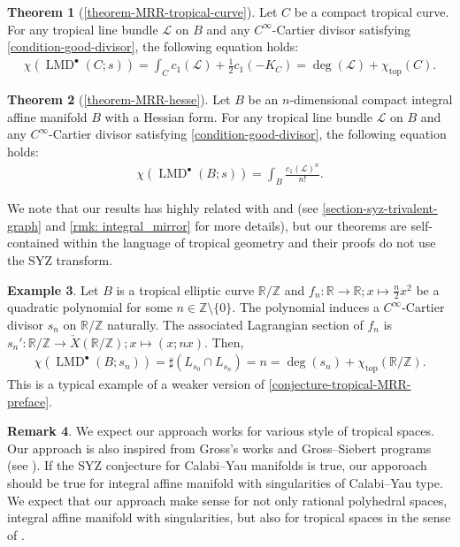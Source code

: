 \documentclass[a4paper,dvipdfmx,reqno,12pt]{amsart}
\theoremstyle{definition}
\newtheorem{theorem}{Theorem}[section]
\newtheorem{example}[theorem]{Example}
\newtheorem{remark}[theorem]{Remark}
\newcommand{\opn}[1]{\operatorname{#1}}
\numberwithin{equation}{section}
\begin{document}
\begin{theorem}[{\cref{theorem-MRR-tropical-curve}}] 
\label{theorem-MRR-curve-preface}
Let $C$ be a compact tropical curve.
For any tropical line bundle 
$\mathcal{L}$ on $B$ and any $C^{\infty}$-Cartier
divisor satisfying \cref{condition-good-divisor},
the following equation holds:
\begin{align}
\chi(\opn{LMD}^{\bullet}(C;s))=
\int_C c_1(\mathcal{L})+\frac{1}{2}c_1(-K_C)
=\opn{deg}(\mathcal{L})+\chi_{\opn{top}}(C). 
\end{align}
\end{theorem}

\begin{theorem}[{\cref{theorem-MRR-hesse}}]
\label{theorem-MRR-hesse-preface}
Let $B$ be an $n$-dimensional compact integral affine manifold $B$ with 
a Hessian form. For any tropical line bundle 
$\mathcal{L}$ on $B$ and any $C^{\infty}$-Cartier
divisor satisfying \cref{condition-good-divisor},
the following equation holds:
\begin{align}
\chi(\opn{LMD}^{\bullet}(B;s))=
\int_B \frac{c_1(\mathcal{L})^{n}}{n!}.
\end{align}

\end{theorem}


We note that our results has highly related with 
 \cite{MR4301560} and \cite{auroux2022lagrangian} (see \cref{section-syz-trivalent-graph} and \cref{rmk: integral_mirror} 
for more details), but our theorems 
are self-contained within the language of tropical 
geometry and their proofs do not use the SYZ
transform.


\begin{example}
Let $B$ is a tropical elliptic curve 
$\mathbb{R}/\mathbb{Z}$ and
$f_n\colon \mathbb{R}\to \mathbb{R};
x\mapsto \frac{n}{2}x^{2}$ be a quadratic polynomial
for some $n\in \mathbb{Z}\setminus\{0\}$.
The polynomial induces a $C^{\infty}$-Cartier divisor 
$s_n$ on $\mathbb{R}/\mathbb{Z}$ naturally.
The associated Lagrangian section of $f_n$ is
$s_n'\colon\mathbb{R}/\mathbb{Z}\to 
\check{X}(\mathbb{R}/\mathbb{Z});x\mapsto (x;nx)$.
Then,
\begin{align}
\chi(\opn{LMD}^{\bullet}(B;s_n))=
\sharp(L_{s_0}\cap L_{s_n})=n
=\opn{deg}(s_n)+\chi_{\opn{top}}(\mathbb{R}/\mathbb{Z}). 
\end{align}
This is a typical example of a weaker version of 
\cref{conjecture-tropical-MRR-preface}.
\end{example}

\begin{remark}
We expect our approach works for various style 
of tropical spaces. 
Our approach is 
also inspired from Gross's 
works 
\cite{grossSpecialLagrangianFibrations1998a} 
and Gross--Siebert programs
(see \cite[Conjecture 1.6]{MR3525095}).
If the SYZ conjecture for Calabi--Yau manifolds
is true, our apporoach should
be true for integral affine manifold 
with singularities of Calabi--Yau type.
We expect that 
our approach make sense for not only rational polyhedral
spaces, integral affine manifold with singularities,
but also for tropical spaces 
in the sense of \cite[Definition 2.8]{cavalieri2020tropical}.
\end{remark}
\end{document}
